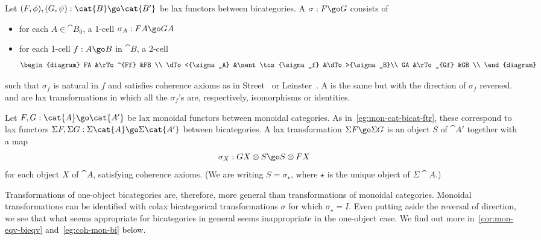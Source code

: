 \begin{defn}
Let $(F, \phi), (G, \psi): \cat{B} \go \cat{B'}$ be lax functors between
bicategories.  A %
%
%
$\sigma: F \go G$ consists of
%
\begin{itemize}
  \item for each $A \in \cat{B}_0$, a 1-cell $\sigma_A: FA \go GA$
  \item for each 1-cell $f: A \go B$ in $\cat{B}$, a 2-cell
  \[
  \begin{diagram}
  FA			&\rTo^{Ff}		&FB		\\
  \dTo<{\sigma_A}	&\nent \tcs{\sigma_f}	&\dTo>{\sigma_B}\\
  GA			&\rTo_{Gf}		&GB		\\
  \end{diagram}
  \]	
\end{itemize}
%
such that $\sigma_f$ is natural in $f$ and satisfies coherence axioms as in
Street~\cite[p.~568]{StrCS} or Leinster~\cite[1.2]{BB}.  A  is the same but with the direction of $\sigma_f$ reversed.
 and  are lax transformations in
which all the $\sigma_f$'s are, respectively, isomorphisms or identities.
\end{defn}

\begin{example}	
Let $F, G: \cat{A} \go \cat{A'}$ be lax monoidal functors between monoidal
categories.  As in~\ref{eg:mon-cat-bicat-ftr}, these correspond%
%
%
to lax
functors $\Sigma F, \Sigma G: \Sigma\cat{A} \go \Sigma\cat{A'}$ between
bicategories.  A lax transformation $\Sigma F \go \Sigma G$ is an object
$S$ of $\cat{A'}$ together with a map
\[
\sigma_X: GX \otimes S \go S \otimes FX
\]
for each object $X$ of $\cat{A}$, satisfying coherence axioms.  (We are
writing $S = \sigma_\star$, where $\star$ is the unique object of
$\Sigma\cat{A}$.)

Transformations of one-object bicategories are, therefore, more general
than transformations of monoidal categories.  Monoidal transformations can
be identified with colax bicategorical transformations $\sigma$ for which
$\sigma_\star = I$.  Even putting aside the reversal of direction, we see
that what seems appropriate for bicategories in general seems inappropriate
in the one-object case.  We find out more in~\ref{cor:mon-eqv-bieqv}
and~\ref{eg:coh-mon-bi} below.
\end{example}

